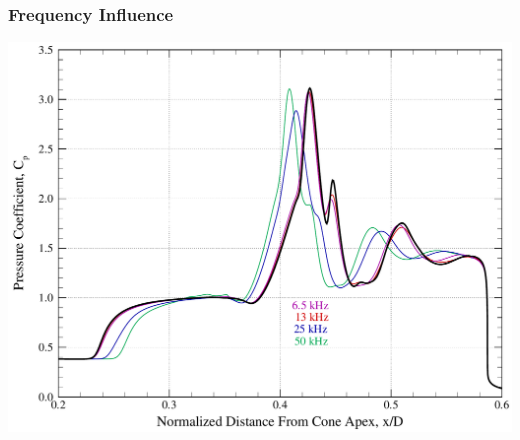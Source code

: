 \documentclass[compress,11pt]{beamer}
\begin{document}
\frame
{
\frametitle{\scriptsize Frequency Influence}
\begin{center}
  \includegraphics[height=.85\textheight]{figures/aedc_double_cone/2894/Cp_freq_comp}
\end{center}
}

\end{document}
